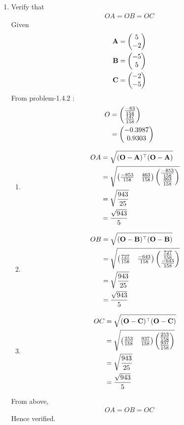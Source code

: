 \documentclass[11pt]{book}
\begin{document}
\begin{enumerate}[label=\thesection.\arabic*.,ref=\thesection.\theenumi]
\item Verify that 
\begin{align}
OA = OB = OC 
\end{align} 
\solution
Given \begin{align}
\mathbf{A} &= \begin{pmatrix}5\\-2\end{pmatrix}\\
\mathbf{B} &= \begin{pmatrix}-5\\5\end{pmatrix}\\
\mathbf{C} &= \begin{pmatrix}-2\\-5\end{pmatrix}
\end{align}
From problem-1.4.2 :
\begin{align}
O &= \begin{pmatrix}\frac{-63}{158} \\ \frac{147}{158}\end{pmatrix}\\
 &= \begin{pmatrix}-0.3987\\ 0.9303\end{pmatrix}
\end{align}
\begin{enumerate}
\item 
\begin{align}
OA &= \sqrt{(\mathbf{O}-\mathbf{A})^{\top}(\mathbf{O}-\mathbf{A})}\\
&= \sqrt{\begin{pmatrix}\frac{-853}{158} & \frac{463}{158}\end{pmatrix} \begin{pmatrix}\frac{-853}{158}\\ \frac{463}{158}\end{pmatrix}}\\
 &= \sqrt{\frac{943}{25}}\\
 &= \frac{\sqrt{943}}{5}
\end{align}
\item 
\begin{align}
OB &= \sqrt{(\mathbf{O}-\mathbf{B})^{\top}(\mathbf{O}-\mathbf{B})}\\
 &= \sqrt{\begin{pmatrix}\frac{727}{158} & \frac{-643}{158}\end{pmatrix} \begin{pmatrix}\frac{727}{158}\\ \frac{-643}{158}\end{pmatrix}}\\
 &= \sqrt{\frac{943}{25}}\\
 &= \frac{\sqrt{943}}{5}
\end{align}
\item 
\begin{align}
OC &= \sqrt{(\mathbf{O}-\mathbf{C})^{\top}(\mathbf{O}-\mathbf{C})}\\
 &= \sqrt{\begin{pmatrix}\frac{253}{158} & \frac{937}{158}\end{pmatrix}  \begin{pmatrix}\frac{253}{158}\\ \frac{937}{158}\end{pmatrix}}\\
 &= \sqrt{\frac{943}{25}}\\
 &= \frac{\sqrt{943}}{5}
\end{align}
\end{enumerate}
From above, 
\begin{align}
OA = OB = OC
\end{align}
Hence verified.


\end{enumerate}
\end{document}
